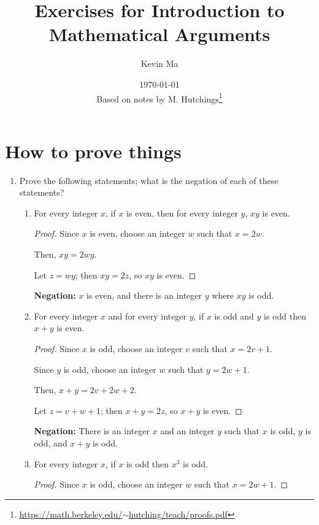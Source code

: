 \documentclass{article}
\title{Exercises for Introduction to Mathematical Arguments}
\author{Kevin Ma}
\date{\today\\\small{Based on notes by M. Hutchings\footnote{\href{https://math.berkeley.edu/\~{}hutching/teach/proofs.pdf}{https://math.berkeley.edu/$\sim$hutching/teach/proofs.pdf}}}}
\newcommand{\negation}[1]{\textbf{Negation:} #1}
\begin{document}
\maketitle

\setcounter{section}{1}

\section{How to prove things}

\begin{enumerate}
  \item Prove the following statements; what is the negation of each
    of these statements?
    \begin{enumerate}
      \item For every integer $x$, if $x$ is even, then for every
        integer $y$, $xy$ is even.

        \begin{proof}
          Since $x$ is even, choose an integer $w$ such that $x = 2w$.

          Then, $xy = 2wy$.

          Let $z=wy$; then $xy=2z$, so $xy$ is even.
        \end{proof}

        \negation{$x$ is even, and there is an integer $y$ where $xy$ is odd.}

      \item For every integer $x$ and for every integer $y$, if $x$
        is odd and $y$ is odd then $x + y$ is even.

        \begin{proof}
          Since $x$ is odd, choose an integer $v$ such that $x=2v+1$.
          
          Since $y$ is odd, choose an integer $w$ such that $y=2w+1$.

          Then, $x+y=2v+2w+2$.

          Let $z=v+w+1$; then $x+y=2z$, so $x+y$ is even.
        \end{proof}

        \negation{There is an integer $x$ and an integer $y$ such that $x$ is odd, $y$ is odd, and $x+y$ is odd.}

      \item For every integer $x$, if $x$ is odd then $x^3$ is odd.

        \begin{proof}
          Since $x$ is odd, choose an integer $w$ such that $x=2w+1$.


\end{proof}
\end{enumerate}
\end{enumerate}
\end{document}
